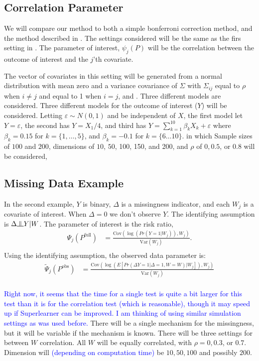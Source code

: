 \documentclass{article}
\newcommand{\indep}{\raisebox{0.05em}{\rotatebox[origin=c]{90}{$\models$}}}
\begin{document}
\subsection{Correlation Parameter}
We will compare our method to both a simple bonferroni correction method, and the method described in \citep{zhang_comment_2015}.  The settings considered will be the same as the firs setting in \citep{mckeague_adaptive_2015}.  The parameter of interest, $\psi_j(P)$ will be the correlation between the outcome of interest and the $j$'th covariate. 

The vector of covariates in this setting will be generated from a normal distribution with mean zero and a variance covariance of $\Sigma$ with $\Sigma_{ij}$ equal to $\rho$ when $i \neq j$ and equal to 1 when $i = j$, and .  Three different models are considered.  Three different models for the outcome of interest ($Y$) will be considered. Letting $\varepsilon \sim N(0, 1)$ and be independent of $X$, the first model let $Y = \varepsilon$, the second has $Y = X_1 / 4$, and third has $Y = \sum_{k = 1}^{10} \beta_k X_k + \varepsilon$ where $\beta_k = 0.15$ for $k = \{1, \dots, 5\}$, and $\beta_k = -0.1$ for $k = \{6 \dots 10\}$.   in which Sample sizes of $100$ and $200$, dimensions of $10$, $50$, 100, 150, and 200, and $\rho$ of  $0, 0.5$, or $0.8$ will be considered,

\subsection{Missing Data Example}
In the second example, $Y$ is binary, $\Delta$ is a missingness indicator, and each $W_j$ is a covariate of interest.  When $\Delta = 0$ we don't observe $Y$.  The identifying assumption is $\Delta \indep Y | W$.  The parameter of interest is the risk ratio,
\begin{align*}
	\Psi_{j}\left(P^{\text{full}}\right) &= \frac{\text{Cov}\left(\log\left(Pr \left(Y = 1 |  W_j\right)\right), W_j\right)}{\text{Var}(W_j)}.\\
\end{align*}
Using the identifying assumption, the observed data parameter is:
\begin{align*}
	\tilde{\Psi}_{j}\left(P^{\text{obs}}\right)&= \frac{\text{Cov}\left(\log\left(E\left[Pr \left(\Delta  Y = 1 | \Delta = 1, W = W\right) |  W_j\right]\right), W_j\right)}{\text{Var}(W_j)}\\
\end{align*}

\textcolor{blue}{Right now, it seems that the time for a single test is quite a bit larger for this test than it is for the correlation test (which is reasonable), though it may speed up if Superlearner can be improved.  I am thinking of using similar simulation settings as was used before.}  There will be a single mechanism for the missingness, but it will be variable if the mechanism is known.  There will be three settings for between $W$ correlation.  All $W$ will be equally correlated, with $\rho = 0, 0.3$, or $0.7$.  Dimension will \textcolor{blue}{(depending on computation time)} be $10, 50, 100$ and possibly $200$.  
\end{document}
